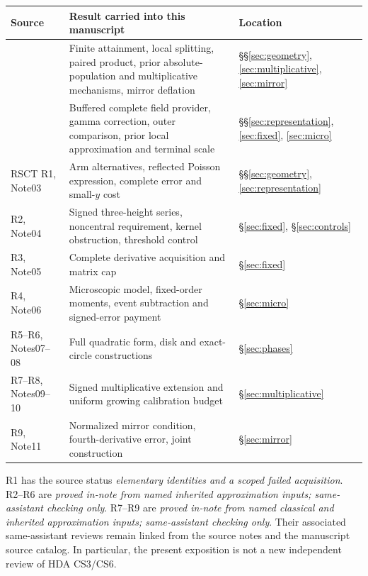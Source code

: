 \begin{center}
\small
\begin{tabularx}{\textwidth}{@{}>{\raggedright\arraybackslash}p{}
 >{\raggedright\arraybackslash}X >{\raggedright\arraybackslash}p{}@{}}
\toprule
Source & Result carried into this manuscript & Location\\
\midrule
\cite{collision,polymath}&Finite attainment, local splitting, paired
product, prior absolute-population and multiplicative mechanisms,
mirror deflation&\S\S\ref{sec:geometry}, \ref{sec:multiplicative}, \ref{sec:mirror}\\
\addlinespace
\cite{hda,gnpe01,s04}&Buffered complete field provider, gamma correction,
outer comparison, prior local approximation and terminal scale&
\S\S\ref{sec:representation}, \ref{sec:fixed}, \ref{sec:micro}\\
\addlinespace
RSCT R1, Note03 \cite{r1}&Arm alternatives, reflected Poisson expression,
complete error and small-\(y\) cost&\S\S\ref{sec:geometry}, \ref{sec:representation}\\
\addlinespace
R2, Note04 \cite{r2}&Signed three-height series, noncentral requirement,
kernel obstruction, threshold control&\S\ref{sec:fixed}, \S\ref{sec:controls}\\
\addlinespace
R3, Note05 \cite{r3}&Complete derivative acquisition and matrix cap&
\S\ref{sec:fixed}\\
\addlinespace
R4, Note06 \cite{r4}&Microscopic model, fixed-order moments, event
subtraction and signed-error payment&\S\ref{sec:micro}\\
\addlinespace
R5--R6, Notes07--08 \cite{r5,r6}&Full quadratic form, disk and
exact-circle constructions&\S\ref{sec:phases}\\
\addlinespace
R7--R8, Notes09--10 \cite{r7,r8}&Signed multiplicative extension and
uniform growing calibration budget&\S\ref{sec:multiplicative}\\
\addlinespace
R9, Note11 \cite{r9}&Normalized mirror condition, fourth-derivative error,
joint construction&\S\ref{sec:mirror}\\
\bottomrule
\end{tabularx}
\end{center}

R1 has the source status \emph{elementary identities and a scoped failed
acquisition}. R2--R6 are \emph{proved in-note from named inherited
approximation inputs; same-assistant checking only}. R7--R9 are
\emph{proved in-note from named classical and inherited approximation inputs;
same-assistant checking only}. Their associated same-assistant reviews
remain linked from the source notes and the manuscript source catalog.
In particular, the present exposition is not a new independent review
of HDA CS3/CS6.

